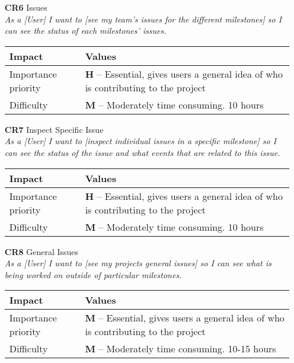 \begin{itemize}
    \item[\textbf{CR6}] Issues\\
        \textit{\small{As a [User] I want to [see my team's issues for the different milestones] so I can see the status of each milestones' issues.}}

        \begin{tabular}{| l | p{8cm} |}
            \hline
            \rowcolor[gray]{0.8}
            \textbf{Impact} & \textbf{Values} \\
            \hline
            Importance priority & \textbf{H} -- Essential, gives users a general idea of who is contributing to the project\\
            Difficulty & \textbf{M} -- Moderately time consuming. 10 hours\\
            \hline
        \end{tabular}
    \vspace{0.5cm}

    \item[\textbf{CR7}] Inspect Specific Issue\\
        \textit{\small{As a [User] I want to [inspect individual issues in a specific milestone] so I can see the status of the issue and what events that are related to this issue.}}

        \begin{tabular}{| l | p{8cm} |}
            \hline
            \rowcolor[gray]{0.8}
            \textbf{Impact} & \textbf{Values} \\
            \hline
            Importance priority & \textbf{H} -- Essential, gives users a general idea of who is contributing to the project\\
            Difficulty & \textbf{M} -- Moderately time consuming. 10 hours\\
            \hline
        \end{tabular}
    \vspace{0.5cm}

    \item[\textbf{CR8}] General Issues\\
        \textit{\small{As a [User] I want to [see my projects general issues] so I can see what is being worked on outside of particular milestones.}}

        \begin{tabular}{| l | p{8cm} |}
            \hline
            \rowcolor[gray]{0.8}
            \textbf{Impact} & \textbf{Values} \\
            \hline
            Importance priority & \textbf{M} -- Essential, gives users a general idea of who is contributing to the project\\
            Difficulty & \textbf{M} -- Moderately time consuming. 10-15 hours\\
            \hline
        \end{tabular}
    \vspace{0.5cm}


\end{itemize}
